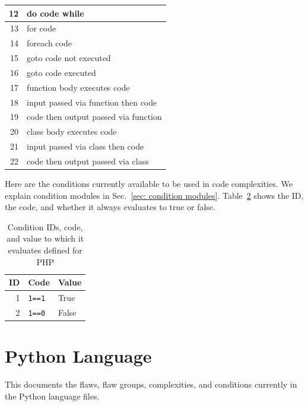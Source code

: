 \begin{appendices}
\begin{table}[H]
\begin{tabular}{|r|l|}
12 & do code while \\
\hline
13 & for code \\
\hline
14 & foreach code \\
\hline
15 & goto code not executed \\
\hline
16 & goto code executed \\
\hline
17 & function body executes code \\
\hline
18 & input passed via function then code \\
\hline
19 & code then output passed via function \\
\hline
20 & class body executes code \\
\hline
21 & input passed via class then code \\
\hline
22 & code then output passed via class \\
\hline
\end{tabular}
\label{tab:complexity IDs for PHP}
\end{table}


Here are the conditions currently available to be used in code complexities.
We explain condition modules in Sec.~\ref{sec: condition modules}.
Table~\ref{tab:condition IDs for PHP} shows the ID, the code, and whether it
always evaluates to true or false.

\begin{table}[H]
\centering
\caption{Condition IDs, code, and value to which it evaluates defined for
  PHP}
\begin{tabular}{|r|l|l|}
\hline
\textbf{ID} & \textbf{Code} & \textbf{Value} \\
\hline
1 & \verb|1==1| & True \\
\hline
2 & \verb|1==0| & False \\
\hline
\end{tabular}
\label{tab:condition IDs for PHP}
\end{table}


\section{Python Language}
\label{sec:Python language}

This documents the flaws, flaw groups, complexities, and conditions currently in the
Python language files.


\end{appendices}
